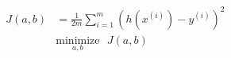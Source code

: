 \documentclass[12pt]{standalone}
\begin{document}

\begin{varwidth}{50in}
	\begin{equation*}
		\begin{aligned}
			 J(a, b)  &= \frac{1}{2m}\sum_{i=1}^{m}(h(x^{(i)}) - y^{(i)})^2 \textrm{ }\\ 
 			& \underset{a,b}{\text{minimize}} \textrm{ }  J(a,b)
		\end{aligned}
	\end{equation*}
\end{varwidth}
\end{document}
